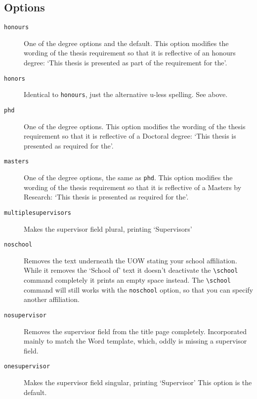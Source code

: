 \documentclass[12pt,oneside]{article}
\newcommand{\oporcom}[1]{\texttt{\color{RoyalBlue}#1}} %
\begin{document}
\subsection*{Options}
\begin{description}
    \item[\oporcom{honours}]
    One of the degree options and the default. This option modifies the wording of the thesis requirement so that it is reflective of an honours degree: `This thesis is presented as part of the requirement for the'.
    
    \item[\oporcom{honors}]
    Identical to \oporcom{honours}, just the alternative u-less spelling. See above.
    
    \item[\oporcom{phd}]
    One of the degree options. This option modifies the wording of the thesis requirement so that it is reflective of a Doctoral degree: `This thesis is presented as required for the'.
    
    \item[\oporcom{masters}]
    One of the degree options, the same as \oporcom{phd}. This option modifies the wording of the thesis requirement so that it is reflective of a Masters by Research: `This thesis is presented as required for the'.
    
    \item[\oporcom{multiplesupervisors}]
    Makes the supervisor field plural, printing `Supervisors'
    
    \item[\oporcom{noschool}]
    Removes the text underneath the UOW stating your school affiliation. While it removes the `School of' text it doesn't deactivate the \oporcom{\textbackslash{}school} command completely it prints an empty space instead. The \oporcom{\textbackslash{}school} command will still works with the \oporcom{noschool} option, so that you can specify another affiliation.
    
    \item[\oporcom{nosupervisor}]
    Removes the supervisor field from the title page completely. Incorporated mainly to match the Word template, which, oddly is missing a supervisor field.
    
    \item[\oporcom{onesupervisor}]
    Makes the supervisor field singular, printing `Supervisor' This option is the default.
\end{description}
\end{document}
